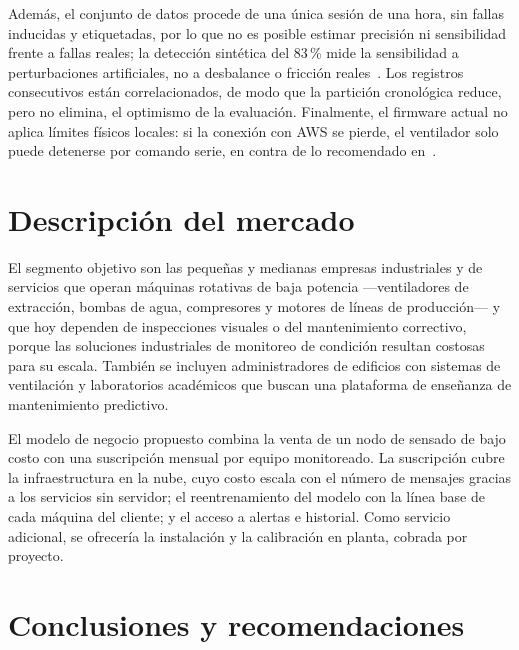 \documentclass[10pt,twocolumn]{article}
\begin{document}
Además, el conjunto de datos procede de una única sesión de una hora, sin fallas inducidas y
etiquetadas, por lo que no es posible estimar precisión ni sensibilidad frente a fallas reales; la
detección sintética del 83\,\% mide la sensibilidad a perturbaciones artificiales, no a desbalance o
fricción reales~\cite{lei2020}. Los registros consecutivos están correlacionados, de modo que la
partición cronológica reduce, pero no elimina, el optimismo de la evaluación. Finalmente, el
firmware actual no aplica límites físicos locales: si la conexión con AWS se pierde, el ventilador
solo puede detenerse por comando serie, en contra de lo recomendado en~\cite{compare2020}.

\section{Descripción del mercado}

El segmento objetivo son las pequeñas y medianas empresas industriales y de servicios que operan
máquinas rotativas de baja potencia ---ventiladores de extracción, bombas de agua, compresores y
motores de líneas de producción--- y que hoy dependen de inspecciones visuales o del mantenimiento
correctivo, porque las soluciones industriales de monitoreo de condición resultan costosas para su
escala. También se incluyen administradores de edificios con sistemas de ventilación y
laboratorios académicos que buscan una plataforma de enseñanza de mantenimiento predictivo.

El modelo de negocio propuesto combina la venta de un nodo de sensado de bajo costo con una
suscripción mensual por equipo monitoreado. La suscripción cubre la infraestructura en la nube,
cuyo costo escala con el número de mensajes gracias a los servicios sin servidor; el
reentrenamiento del modelo con la línea base de cada máquina del cliente; y el acceso a alertas e
historial. Como servicio adicional, se ofrecería la instalación y la calibración en planta,
cobrada por proyecto.

\section{Conclusiones y recomendaciones}
\end{document}
